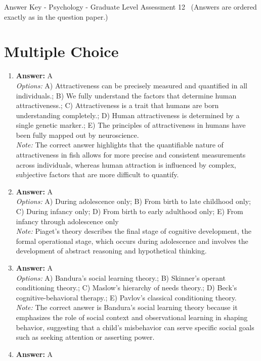 \documentclass[12pt]{article}
\begin{document}
\begin{center}
Answer Key - Psychology - Graduate Level Assessment 12 \
\small (Answers are ordered exactly as in the question paper.)
\end{center}

\section*{Multiple Choice}
\begin{enumerate}[label=\arabic*.]
\item \textbf{Answer:} A
\\ \textit{Options:} A) Attractiveness can be precisely measured and quantified in all individuals.; B) We fully understand the factors that determine human attractiveness.; C) Attractiveness is a trait that humans are born understanding completely.; D) Human attractiveness is determined by a single genetic marker.; E) The principles of attractiveness in humans have been fully mapped out by neuroscience.
\\ \textit{Note:} The correct answer highlights that the quantifiable nature of attractiveness in fish allows for more precise and consistent measurements across individuals, whereas human attraction is influenced by complex, subjective factors that are more difficult to quantify.
\item \textbf{Answer:} A
\\ \textit{Options:} A) During adolescence only; B) From birth to late childhood only; C) During infancy only; D) From birth to early adulthood only; E) From infancy through adolescence only
\\ \textit{Note:} Piaget's theory describes the final stage of cognitive development, the formal operational stage, which occurs during adolescence and involves the development of abstract reasoning and hypothetical thinking.
\item \textbf{Answer:} A
\\ \textit{Options:} A) Bandura's social learning theory.; B) Skinner's operant conditioning theory.; C) Maslow's hierarchy of needs theory.; D) Beck's cognitive-behavioral therapy.; E) Pavlov's classical conditioning theory.
\\ \textit{Note:} The correct answer is Bandura's social learning theory because it emphasizes the role of social context and observational learning in shaping behavior, suggesting that a child's misbehavior can serve specific social goals such as seeking attention or asserting power.
\item \textbf{Answer:} A

\end{enumerate}
\end{document}
